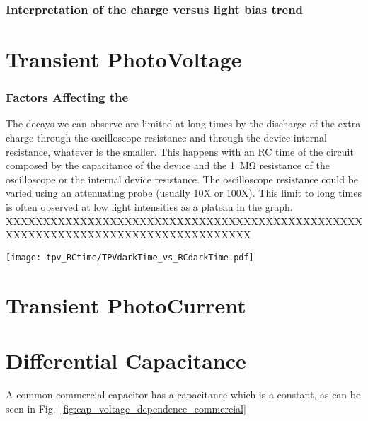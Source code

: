	\subsubsection{Interpretation of the charge versus light bias trend}


\section{Transient PhotoVoltage}\label{interpretation_tpv}

	\subsubsection{Factors Affecting the }
		The decays we can observe are limited at long times by the discharge of the extra charge through the oscilloscope resistance and through the device internal resistance, whatever is the smaller. This happens with an RC time of the circuit composed by the capacitance of the device and the \SI{1}{\Mohm} resistance of the oscilloscope or the internal device resistance. The oscilloscope resistance could be varied using an attenuating probe (usually 10X or 100X). This limit to long times is often observed at low light intensities as a plateau in the  graph. XXXXXXXXXXXXXXXXXXXXXXXXXXXXXXXXXXXXXXXXXXXXXXXXXXXXXXXXXXXXXXXXXXXXXXXXXXXXXXXXX

		\begin{SCfigure}
			\centering
			\texttt{[image: tpv\_RCtime/TPVdarkTime\_vs\_RCdarkTime.pdf]}
			\label{fig:tpv_RCtime}
		\end{SCfigure}


\section{Transient PhotoCurrent}\label{interpretation_tpc}

\section{Differential Capacitance}\label{interpretation_dc}

	A common commercial capacitor has a capacitance which is a constant, as can be seen in Fig.~\ref{fig:cap_voltage_dependence_commercial}

